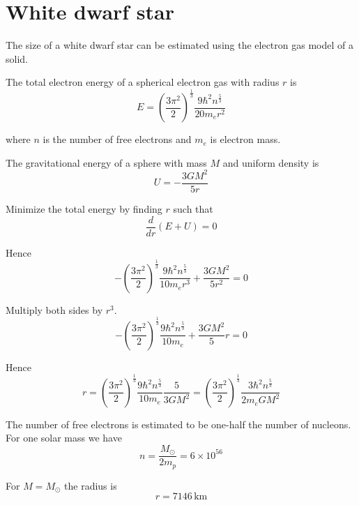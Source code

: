 


\section*{White dwarf star}

The size of a white dwarf star can be estimated using the electron gas model of a solid.

\bigskip
The total electron energy of a spherical electron gas with radius $r$ is
\begin{equation*}
E=\left(\frac{3\pi^2}{2}\right)^\frac{1}{3}
\frac{9\hbar^2n^\frac{5}{3}}{20m_er^2}
\end{equation*}

where $n$ is the number of free electrons and $m_e$ is electron mass.

\bigskip
The gravitational energy of a sphere with mass $M$ and uniform density is
\begin{equation*}
U=-\frac{3GM^2}{5r}
\end{equation*}

Minimize the total energy by finding $r$ such that
\begin{equation*}
\frac{d}{dr}(E+U)=0
\end{equation*}

Hence
\begin{equation*}
-\left(\frac{3\pi^2}{2}\right)^\frac{1}{3}
\frac{9\hbar^2n^\frac{5}{3}}{10m_er^3}+\frac{3GM^2}{5r^2}=0
\end{equation*}

Multiply both sides by $r^3$.
\begin{equation*}
-\left(\frac{3\pi^2}{2}\right)^\frac{1}{3}
\frac{9\hbar^2n^\frac{5}{3}}{10m_e}+\frac{3GM^2}{5}r=0
\end{equation*}

Hence
\begin{equation*}
r=\left(\frac{3\pi^2}{2}\right)^\frac{1}{3}
\frac{9\hbar^2n^\frac{5}{3}}{10m_e}
\frac{5}{3GM^2}
=\left(\frac{3\pi^2}{2}\right)^\frac{1}{3}
\frac{3\hbar^2n^\frac{5}{3}}{2m_eGM^2}
\tag{1}
\end{equation*}

The number of free electrons is estimated to be one-half the number of nucleons.
For one solar mass we have
\begin{equation*}
n=\frac{M_{\odot}}{2m_p}=6\times10^{56}
\end{equation*}

For $M=M_{\odot}$ the radius is
\begin{equation*}
r=7146\,\text{km}
\end{equation*}


